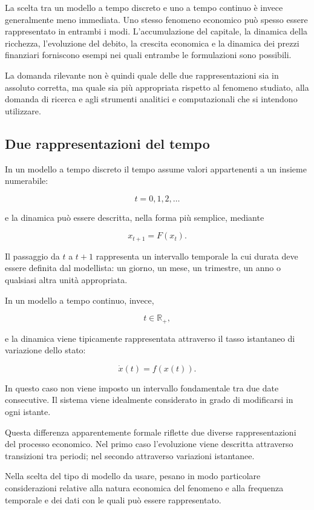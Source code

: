 \documentclass{book}
\begin{document}
La scelta tra un modello a tempo discreto e uno a tempo continuo è invece generalmente meno immediata. Uno stesso fenomeno economico può spesso essere rappresentato in entrambi i modi. L'accumulazione del capitale, la dinamica della ricchezza, l'evoluzione del debito, la crescita economica e la dinamica dei prezzi finanziari forniscono esempi nei quali entrambe le formulazioni sono possibili.

La domanda rilevante non è quindi quale delle due rappresentazioni sia in assoluto corretta, ma quale sia più appropriata rispetto al fenomeno studiato, alla domanda di ricerca e agli strumenti analitici e computazionali che si intendono utilizzare.

\subsection{Due rappresentazioni del tempo}

In un modello a tempo discreto il tempo assume valori appartenenti a un insieme numerabile:

$$
t=0,1,2,\ldots
$$

e la dinamica può essere descritta, nella forma più semplice, mediante

$$
x_{t+1}=F(x_t).
$$

Il passaggio da $t$ a $t+1$ rappresenta un intervallo temporale la cui durata deve essere definita dal modellista: un giorno, un mese, un trimestre, un anno o qualsiasi altra unità appropriata.

In un modello a tempo continuo, invece,

$$
t\in\mathbb{R}_{+},
$$

e la dinamica viene tipicamente rappresentata attraverso il tasso istantaneo di variazione dello stato:

$$
\dot{x}(t)=f(x(t)).
$$

In questo caso non viene imposto un intervallo fondamentale tra due date consecutive. Il sistema viene idealmente considerato in grado di modificarsi in ogni istante.

Questa differenza apparentemente formale riflette due diverse rappresentazioni del processo economico. Nel primo caso l'evoluzione viene descritta attraverso transizioni tra periodi; nel secondo attraverso variazioni istantanee.

Nella scelta del tipo di modello da usare, pesano in modo particolare considerazioni relative alla natura economica del fenomeno e alla frequenza temporale e dei dati con le quali può essere rappresentato.
\end{document}
